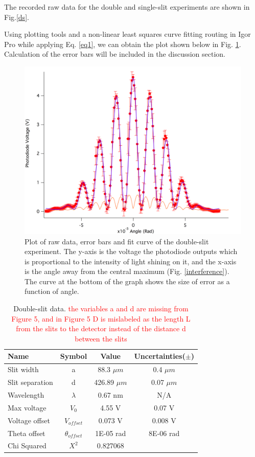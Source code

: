 \documentclass[prb,preprint]{revtex4-1}
\begin{document}
\newpage

The recorded raw data for the double and single-slit experiments are shown in Fig.\ref{ds}. 

Using plotting tools and a non-linear least squares curve fitting routing in Igor Pro while applying Eq. \ref{eq1}, we can obtain the plot shown below in Fig. \ref{double}. Calculation of the error bars will be included in the discussion section.

\begin{figure}[h]
\centering
\includegraphics[width=7in]{double.png}
\caption{Plot of raw data, error bars and fit curve of the double-slit experiment. The y-axis is the voltage the photodiode outputs which is proportional to the intensity of light shining on it, and the x-axis is the angle away from the central maximum (Fig. \ref{interference}). The curve at the bottom of the graph shows the size of error as a function of angle.}
\label{double}
\end{figure}


\begin{table}[h]
\centering
\caption{Double-slit data. \textcolor{red}{the variables a and d are missing from Figure 5, and in Figure 5 D is mislabeled as the length L from the slits to the detector instead of the distance d between the slits}}
\begin{ruledtabular}
\begin{tabular}{ l c c c}
Name & Symbol & Value & Uncertainties($\pm$)\\
\hline
Slit width & a & 88.3 $\mu m$ & 0.4 $\mu m$\\
Slit separation & d & 426.89 $\mu m$ & 0.07 $\mu m$\\
Wavelength & $\lambda$ & 0.67 nm & N/A \\
Max voltage & $V_0$ & 4.55 V & 0.07 V\\
Voltage offset & $V_{offset}$ & 0.073 V & 0.008 V\\
Theta offset &$ \theta_{offset}$ & 1E-05 rad & 8E-06 rad \\
\hline
Chi Squared & $X^2$ & 0.827068&
\end{tabular}
\end{ruledtabular}
\label{data}
\end{table}
\end{document}
